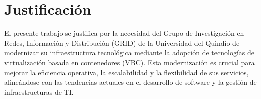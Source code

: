\chapter*{Justificación}
El presente trabajo se justifica por la necesidad del Grupo de Investigación en Redes, Información y Distribución (GRID) de la Universidad del Quindío de modernizar su infraestructura tecnológica mediante la adopción de tecnologías de virtualización basada en contenedores (VBC). Esta modernización es crucial para mejorar la eficiencia operativa, la escalabilidad y la flexibilidad de sus servicios, alineándose con las tendencias actuales en el desarrollo de software y la gestión de infraestructuras de TI.\@